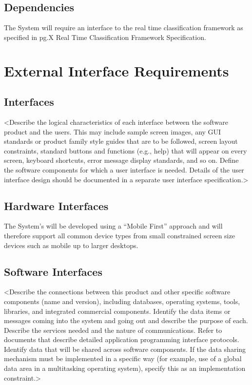 \documentclass[11pt]{report}
\begin{document}
\subsection*{Dependencies}
The System will require an interface to the real time classification framework as specified in pg.X Real Time Classification Framework Specification.

\section*{External Interface Requirements}
\subsection*{Interfaces}
<Describe the logical characteristics of each interface between the software product and the users. This may include sample screen images, any GUI standards or product family style guides that are to be followed, screen layout constraints, standard buttons and functions (e.g., help) that will appear on every screen, keyboard shortcuts, error message display standards, and so on. Define the software components for which a user interface is needed. Details of the user interface design should be documented in a separate user interface specification.>
\subsection*{Hardware Interfaces}
The System’s will be developed using a “Mobile First” approach and will therefore support all common device types from small constrained screen size devices such as mobile up to larger desktops.

\subsection*{Software Interfaces}
<Describe the connections between this product and other specific software components (name and version), including databases, operating systems, tools, libraries, and integrated commercial components. Identify the data items or messages coming into the system and going out and describe the purpose of each. Describe the services needed and the nature of communications. Refer to documents that describe detailed application programming interface protocols. Identify data that will be shared across software components. If the data sharing mechanism must be implemented in a specific way (for example, use of a global data area in a multitasking operating system), specify this as an implementation constraint.>
\end{document}
